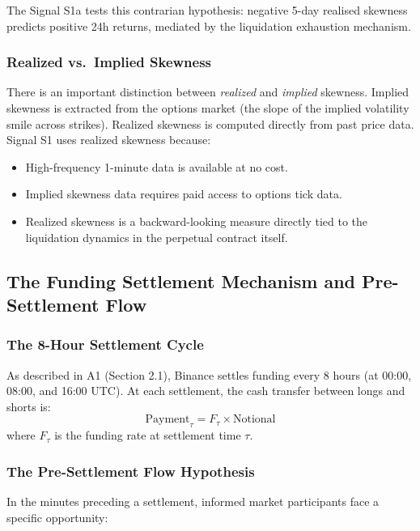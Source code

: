 \documentclass[12pt, a4paper]{article}
\theoremstyle{plain}
\theoremstyle{definition}
\begin{document}
The Signal S1a tests this contrarian hypothesis: negative 5-day realised
skewness predicts positive 24h returns, mediated by the liquidation
exhaustion mechanism.

\subsubsection{Realized vs.\ Implied Skewness}

There is an important distinction between \emph{realized} and
\emph{implied} skewness.  Implied skewness is extracted from the
options market (the slope of the implied volatility smile across strikes).
Realized skewness is computed directly from past price data.  Signal S1
uses realized skewness because:

\begin{itemize}[noitemsep]
  \item High-frequency 1-minute data is available at no cost.
  \item Implied skewness data requires paid access to options tick data.
  \item Realized skewness is a backward-looking measure directly tied
        to the liquidation dynamics in the perpetual contract itself.
\end{itemize}

\subsection{The Funding Settlement Mechanism and Pre-Settlement Flow}
\label{sec:settlement_theory}

\subsubsection{The 8-Hour Settlement Cycle}

As described in A1 (Section 2.1), Binance settles funding every 8 hours
(at 00:00, 08:00, and 16:00 UTC).  At each settlement, the cash transfer
between longs and shorts is:
\begin{equation}
  \text{Payment}_\tau = F_\tau \times \text{Notional}
\end{equation}
where $F_\tau$ is the funding rate at settlement time $\tau$.

\subsubsection{The Pre-Settlement Flow Hypothesis}

In the minutes preceding a settlement, informed market participants face
a specific opportunity:
\end{document}
